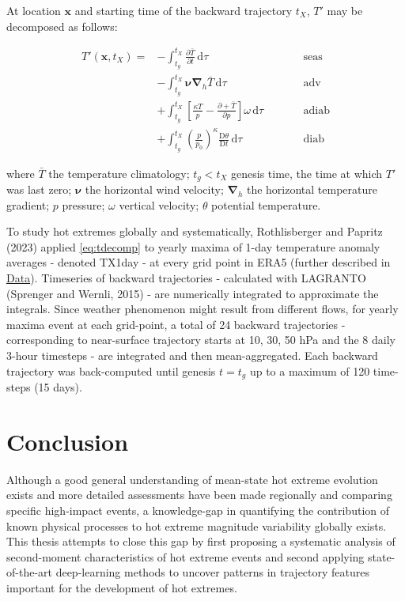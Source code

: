 \documentclass[11pt,a4paper,twoside,openright]{report}
\theoremstyle{definition}
\begin{document}
At location \(\mathbf{x}\) and starting time of the backward trajectory \(t_X\), \(T'\) may be decomposed as follows:

\begin{equation}
\begin{alignedat}{2}
   T'(\mathbf{x},t_X) = & - \int_{t_g}^{t_X} \frac{\partial \bar{T}}{\partial t} \, \text{d}\tau && \qquad \text{seas} \\
   & - \int_{t_g}^{t_X} \mathbf{\nu} \mathbf{\nabla}_h \bar{T} \, \text{d}\tau && \qquad \text{adv} \\
   & + \int_{t_g}^{t_X} \left[ \frac{\kappa T}{p} - \frac{\partial +  \bar{T}}{\partial p}\right] \omega \, \text{d}\tau && \qquad \text{adiab} \\
   & + \int_{t_g}^{t_X} \left( \frac{p}{p_0} \right)^\kappa \frac{\text{D}\theta}{\text{D}t} \, \text{d}\tau && \qquad \text{diab}
\end{alignedat}
\label{eq:tdecomp}
\end{equation}

where \(\bar{T}\) the temperature climatology; \(t_g < t_X\) genesis time, the time at which \(T'\) was last zero; \(\mathbf{\nu}\) the horizontal wind velocity; \(\mathbf{\nabla}_h\) the horizontal temperature gradient; \(p\) pressure; \(\omega\) vertical velocity; \(\theta\) potential temperature.

To study hot extremes globally and systematically, Rothlisberger and Papritz (2023) applied \eqref{eq:tdecomp} to yearly maxima of 1-day temperature anomaly averages - denoted TX1day - at every grid point in ERA5 (further described in \hyperref[data]{Data}). Timeseries of backward trajectories - calculated with LAGRANTO (Sprenger and Wernli, 2015) - are numerically integrated to approximate the integrals. Since weather phenomenon might result from different flows, for yearly maxima event at each grid-point, a total of 24 backward trajectories - corresponding to near-surface trajectory starts at 10, 30, 50 hPa and the 8 daily 3-hour timesteps - are integrated and then mean-aggregated. Each backward trajectory was back-computed until genesis \(t=t_g\) up to a maximum of 120 time-steps (15 days).

\section{Conclusion}\label{conclusion}

Although a good general understanding of mean-state hot extreme evolution exists and more detailed assessments have been made regionally and comparing specific high-impact events, a knowledge-gap in quantifying the contribution of known physical processes to hot extreme magnitude variability globally exists. This thesis attempts to close this gap by first proposing a systematic analysis of second-moment characteristics of hot extreme events and second applying state-of-the-art deep-learning methods to uncover patterns in trajectory features important for the development of hot extremes.
\end{document}
